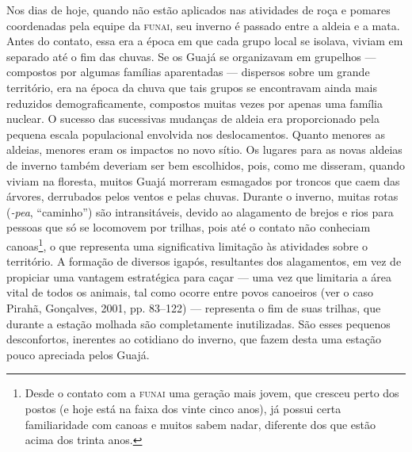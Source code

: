 Nos dias de hoje, quando não estão aplicados nas atividades de roça e
pomares coordenadas pela equipe da \textsc{funai}, seu inverno é passado entre a
aldeia e a mata. Antes do contato, essa era a época em que cada grupo
local se isolava, viviam em separado até o fim das chuvas. Se os Guajá
se organizavam em grupelhos --- compostos por algumas famílias aparentadas
--- dispersos sobre um grande território, era na época da chuva que tais
grupos se encontravam ainda mais reduzidos demograficamente, compostos
muitas vezes por apenas uma família nuclear. O sucesso das sucessivas
mudanças de aldeia era proporcionado pela pequena escala populacional
envolvida nos deslocamentos. Quanto menores as aldeias, menores eram os
impactos no novo sítio. Os lugares para as novas aldeias de inverno
também deveriam ser bem escolhidos, pois, como me disseram, quando
viviam na floresta, muitos Guajá morreram esmagados por troncos que caem
das árvores, derrubados pelos ventos e pelas chuvas. Durante o inverno,
muitas rotas (\emph{-pea}, ``caminho'') são intransitáveis, devido ao
alagamento de brejos e rios para pessoas que só se locomovem por
trilhas, pois até o contato não conheciam canoas\footnote{Desde o
  contato com a \textsc{funai} uma geração mais jovem, que cresceu perto dos
  postos (e hoje está na faixa dos vinte cinco anos), já possui certa
  familiaridade com canoas e muitos sabem nadar, diferente dos que estão
  acima dos trinta anos.}, o que representa uma significativa limitação
às atividades sobre o território. A formação de diversos igapós,
resultantes dos alagamentos, em vez de propiciar uma vantagem
estratégica para caçar --- uma vez que limitaria a área vital de todos os
animais, tal como ocorre entre povos canoeiros (ver o caso Pirahã,
Gonçalves, 2001, pp. 83--122) --- representa o fim de suas trilhas, que
durante a estação molhada são completamente inutilizadas. São esses
pequenos desconfortos, inerentes ao cotidiano do inverno, que fazem
desta uma estação pouco apreciada pelos Guajá.

